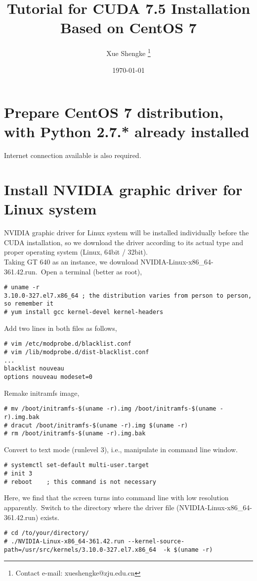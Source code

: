 \documentclass[UTF8,a4paper,12pt]{article}
\title{Tutorial for CUDA 7.5 Installation \\ Based on CentOS 7}
\author{ Xue Shengke \thanks{Contact e-mail: xueshengke@zju.edu.cn} }
\date{\today}
\begin{document}
\maketitle

\section{Prepare CentOS 7 distribution, with Python 2.7.* already installed}
Internet connection available is also required.

\section{Install NVIDIA graphic driver for Linux system}
NVIDIA graphic driver for Linux system will be installed individually before the CUDA installation, so we download the driver according to its actual type and proper operating system (Linux, 64bit / 32bit). \\
Taking GT 640 as an instance, we download NVIDIA-Linux-x86\_64-361.42.run.~Open a terminal (better as root),
\begin{lstlisting}
# uname -r
3.10.0-327.el7.x86_64 ; the distribution varies from person to person, so remember it 
# yum install gcc kernel-devel kernel-headers
\end{lstlisting}
Add two lines in both files as follows,
\begin{lstlisting}
# vim /etc/modprobe.d/blacklist.conf
# vim /lib/modprobe.d/dist-blacklist.conf
...
blacklist nouveau
options nouveau modeset=0
\end{lstlisting}
Remake initramfs image,
\begin{lstlisting}
# mv /boot/initramfs-$(uname -r).img /boot/initramfs-$(uname -r).img.bak
# dracut /boot/initramfs-$(uname -r).img $(uname -r)
# rm /boot/initramfs-$(uname -r).img.bak
\end{lstlisting}
Convert to text mode (runlevel 3), i.e., manipulate in command line window.
\begin{lstlisting}
# systemctl set-default multi-user.target
# init 3
# reboot	; this command is not necessary
\end{lstlisting}
Here, we find that the screen turns into command line with low resolution  apparently.~Switch to the directory where the driver file (NVIDIA-Linux-x86\_64-361.42.run) exists.
\begin{lstlisting}
# cd /to/your/directory/
# ./NVIDIA-Linux-x86_64-361.42.run --kernel-source-path=/usr/src/kernels/3.10.0-327.el7.x86_64  -k $(uname -r)
\end{lstlisting}
\end{document}
